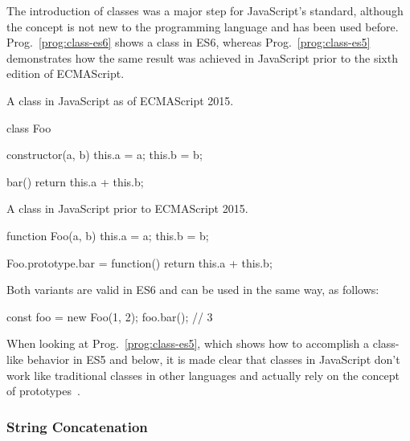 The introduction of classes was a major step for JavaScript's standard, although the concept is not new to the programming language and has been used before. Prog.~\ref{prog:class-es6} shows a class in ES6, whereas Prog.~\ref{prog:class-es5} demonstrates how the same result was achieved in JavaScript prior to the sixth edition of ECMAScript.
\begin{program}
\caption{A class in JavaScript as of ECMAScript 2015.}
\label{prog:class-es6}
\begin{JsCode}
class Foo {
  
  constructor(a, b) {
    this.a = a;
    this.b = b;
  } 
  
  bar() {
    return this.a + this.b;
  }
  
}
\end{JsCode}
\end{program}
\begin{program}
\caption{A class in JavaScript prior to ECMAScript 2015.}
\label{prog:class-es5}
\begin{JsCode}
function Foo(a, b) {
  this.a = a;
  this.b = b;
}

Foo.prototype.bar = function() {
  return this.a + this.b;
}
\end{JsCode}
\end{program}
Both variants are valid in ES6 and can be used in the same way, as follows:
\begin{JsCode}[numbers=none]
const foo = new Foo(1, 2);
foo.bar(); // 3
\end{JsCode}
When looking at Prog.~\ref{prog:class-es5}, which shows how to accomplish a class-like behavior in ES5 and below, it is made clear that classes in JavaScript don't work like traditional classes in other languages and actually rely on the concept of prototypes~\cite[p.~135]{YDKJS:ES6AndBeyond:Simpson:2015}.

\subsubsection{String Concatenation}

